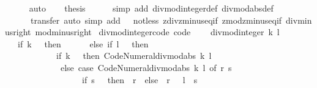 \begin{isabellebody}
\ \ \ \ \isamarkupfalse%
\ auto\isanewline
\ \ \isamarkupfalse%
\ {\isacharquery}{\kern0pt}thesis\isanewline
\ \ \ \ \isamarkupfalse%
\ {\isacharparenleft}{\kern0pt}simp\ add{\isacharcolon}{\kern0pt}\ divmod{\isacharunderscore}{\kern0pt}integer{\isacharunderscore}{\kern0pt}def\ divmod{\isacharunderscore}{\kern0pt}abs{\isacharunderscore}{\kern0pt}def{\isacharparenright}{\kern0pt}\isanewline
\ \ \ \ \ \ {\isacharparenleft}{\kern0pt}transfer{\isacharcomma}{\kern0pt}\ auto\ simp\ add{\isacharcolon}{\kern0pt}\ {\isacharasterisk}{\kern0pt}\ {\isacharasterisk}{\kern0pt}{\isacharasterisk}{\kern0pt}\ not{\isacharunderscore}{\kern0pt}less\ zdiv{\isacharunderscore}{\kern0pt}zminus{}{\isacharunderscore}{\kern0pt}eq{\isacharunderscore}{\kern0pt}if\ zmod{\isacharunderscore}{\kern0pt}zminus{}{\isacharunderscore}{\kern0pt}eq{\isacharunderscore}{\kern0pt}if\ div{\isacharunderscore}{\kern0pt}minus{\isacharunderscore}{\kern0pt}right\ mod{\isacharunderscore}{\kern0pt}minus{\isacharunderscore}{\kern0pt}right{\isacharparenright}{\kern0pt}\isanewline
{}\isamarkupfalse%
%
\endisatagproof
{\isafoldproof}%
%
\isadelimproof
\isanewline
%
\endisadelimproof
\isanewline
{}\isamarkupfalse%
\ divmod{\isacharunderscore}{\kern0pt}integer{\isacharunderscore}{\kern0pt}code\ {\isacharbrackleft}{\kern0pt}code{\isacharbrackright}{\kern0pt}{\isacharcolon}{\kern0pt}\ \ \isanewline
\ \ {\isachardoublequoteopen}divmod{\isacharunderscore}{\kern0pt}integer\ k\ l\ {\isacharequal}{\kern0pt}\isanewline
\ \ \ {\isacharparenleft}{\kern0pt}if\ k\ {\isacharequal}{\kern0pt}\ {}\ then\ {\isacharparenleft}{\kern0pt}{}{\isacharcomma}{\kern0pt}\ {}{\isacharparenright}{\kern0pt}\isanewline
\ \ \ \ else\ if\ l\ {\isachargreater}{\kern0pt}\ {}\ then\isanewline
\ \ \ \ \ \ \ \ \ \ \ \ {\isacharparenleft}{\kern0pt}if\ k\ {\isachargreater}{\kern0pt}\ {}\ then\ Code{\isacharunderscore}{\kern0pt}Numeral{\isachardot}{\kern0pt}divmod{\isacharunderscore}{\kern0pt}abs\ k\ l\isanewline
\ \ \ \ \ \ \ \ \ \ \ \ \ else\ case\ Code{\isacharunderscore}{\kern0pt}Numeral{\isachardot}{\kern0pt}divmod{\isacharunderscore}{\kern0pt}abs\ k\ l\ of\ {\isacharparenleft}{\kern0pt}r{\isacharcomma}{\kern0pt}\ s{\isacharparenright}{\kern0pt}\ {\isasymRightarrow}\isanewline
\ \ \ \ \ \ \ \ \ \ \ \ \ \ \ \ \ \ if\ s\ {\isacharequal}{\kern0pt}\ {}\ then\ {\isacharparenleft}{\kern0pt}{\isacharminus}{\kern0pt}\ r{\isacharcomma}{\kern0pt}\ {}{\isacharparenright}{\kern0pt}\ else\ {\isacharparenleft}{\kern0pt}{\isacharminus}{\kern0pt}\ r\ {\isacharminus}{\kern0pt}\ {}{\isacharcomma}{\kern0pt}\ l\ {\isacharminus}{\kern0pt}\ s{\isacharparenright}{\kern0pt}{\isacharparenright}{\kern0pt}\isanewline

\end{isabellebody}

